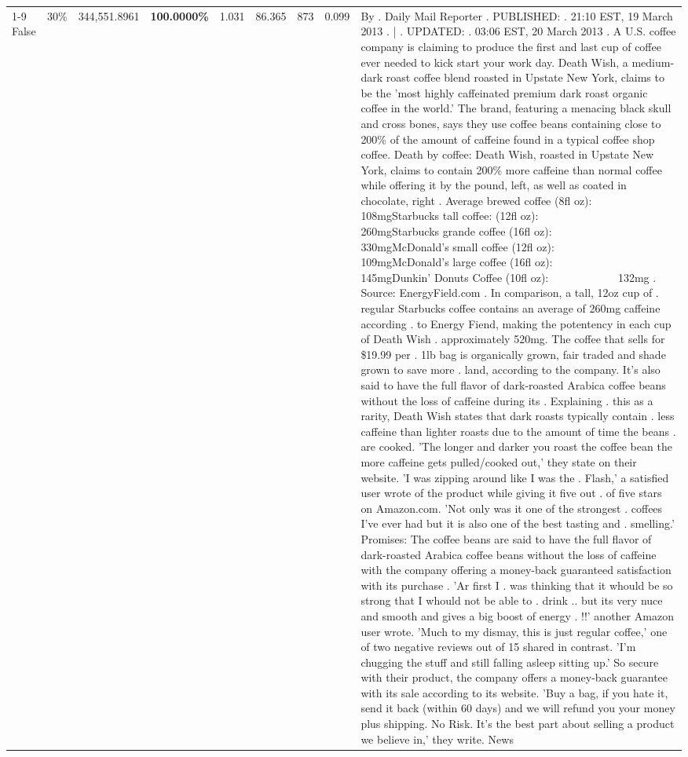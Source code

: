 \begin{table}[H]
{\begin{tabular}{lllrlllll}
\cline{1-9} \cline{2-9}
False & 30\% & 344,551.8961 & \bfseries \color{red} 100.0000\% & 1.031 & 86.365 & 873 & 0.099 & By . Daily Mail Reporter . PUBLISHED: . 21:10 EST, 19 March 2013 . | . UPDATED: . 03:06 EST, 20 March 2013 . A U.S. coffee company is claiming to produce the first and last cup of coffee ever needed to kick start your work day. Death Wish, a medium-dark roast coffee blend roasted in Upstate New York, claims to be the 'most highly caffeinated premium dark roast organic coffee in the world.' The brand, featuring a menacing black skull and cross bones, says they use coffee beans containing close to 200\% of the amount of caffeine found in a typical coffee shop coffee. Death by coffee: Death Wish, roasted in Upstate New York, claims to contain 200\% more caffeine than normal coffee while offering it by the pound, left, as well as coated in chocolate, right . Average brewed coffee (8fl oz):              108mgStarbucks tall coffee: (12fl oz):                260mgStarbucks grande coffee (16fl oz):         330mgMcDonald's small coffee (12fl oz):           109mgMcDonald's large coffee (16fl oz):           145mgDunkin' Donuts Coffee (10fl oz):             132mg . Source: EnergyField.com . In comparison, a tall, 12oz cup of . regular Starbucks coffee contains an average of 260mg caffeine according . to Energy Fiend, making the potentency in each cup of Death Wish . approximately 520mg. The coffee that sells for \$19.99 per . 1lb bag is organically grown, fair traded and shade grown to save more . land, according to the company. It's also said to have the full flavor of dark-roasted Arabica coffee beans without the loss of caffeine during its . Explaining . this as a rarity, Death Wish states that dark roasts typically contain . less caffeine than lighter roasts due to the amount of time the beans . are cooked. 'The longer and darker you roast the coffee bean the more caffeine gets pulled/cooked out,' they state on their website. 'I was zipping around like I was the . Flash,' a satisfied user wrote of the product while giving it five out . of five stars on Amazon.com. 'Not only was it one of the strongest . coffees I've ever had but it is also one of the best tasting and . smelling.’ Promises: The coffee beans are said to have the full flavor of dark-roasted Arabica coffee beans without the loss of caffeine with the company offering a money-back guaranteed satisfaction with its purchase . 'Ar first I . was thinking that it whould be so strong that I whould not be able to . drink .. but its very nuce and smooth and gives a big boost of energy . !!' another Amazon user wrote. 'Much to my dismay, this is just regular coffee,' one of two negative reviews out of 15 shared in contrast. 'I'm chugging the stuff and still falling asleep sitting up.' So secure with their product, the company offers a money-back guarantee with its sale according to its website. 'Buy a bag, if you hate it, send it back (within 60 days) and we will refund you your money plus shipping. No Risk. It’s the best part about selling a product we believe in,' they write. News \\

\end{tabular}}
\end{table}
